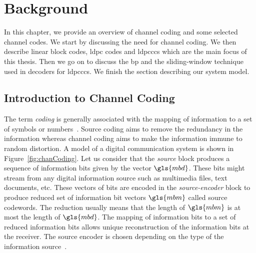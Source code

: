\chapter{Background}\label{ch:back}
In this chapter, we provide an overview of channel coding and some selected channel codes. We start by discussing the need for channel coding. We then describe linear block codes, \gls{ldpc} codes and \glspl{ldpccc} which are the main focus of this thesis. Then we go on to discuss the \gls{bp} and the sliding-window technique used in decoders for \glspl{ldpccc}. We finish the section describing our system model.

\section{Introduction to Channel Coding}
The term \emph{coding} is generally associated with the mapping of information to a set of symbols or numbers~\cite{Bossert}. Source coding aims to remove the redundancy in the information whereas channel coding aims to make the information immune to random distortion. A model of a digital communication system is shown in Figure~\ref{fig:chanCoding}. Let us consider that the \emph{source} block produces a sequence of information bits given by the vector $\gls{mbd}$. These bits might stream from any digital information source such as multimedia files, text documents, etc. These vectors of bits are encoded in the \emph{source-encoder} block to produce reduced set of information bit vectors $\gls{mbm}$ called source codewords. The reduction usually means that the length of $\gls{mbm}$ is at most the length of $\gls{mbd}$. The mapping of information bits to a set of reduced information bits allows unique reconstruction of the information bits at the receiver. The source encoder is chosen depending on the type of the information source~\cite{proak}.

